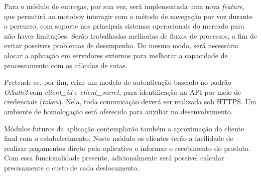 Para o módulo de entregas, por sua vez, será implementada uma nova \textit{feature}, que permitirá ao motoboy interagir com o método de navegação por voz durante o percurso, com suporte nos principais sistemas operacionais do mercado para não haver limitações. Serão trabalhadas melhorias de fluxos de processos, a fim de evitar possíveis problemas de desempenho. Do mesmo modo, será necessário alocar a aplicação em servidores externos para melhorar a capacidade de processamento com os cálculos de rotas.

Pretende-se, por fim, criar um modelo de autenticação baseado no padrão \textit{OAuth2} com \textit{client\_id} e \textit{client\_secret}, para identificação na API por meio de credenciais (\textit{token}). Nela, toda comunicação deverá ser realizada sob HTTPS. Um ambiente de homologação será oferecido para auxiliar no desenvolvimento.

Módulos futuros da aplicação contemplarão também a aproximação do cliente final com o estabelecimento. Neste módulo os clientes terão a facilidade de realizar pagamentos direto pelo aplicativo e informar o recebimento do produto. Com essa funcionalidade presente, adicionalmente será possível calcular precisamente o custo de cada deslocamento.